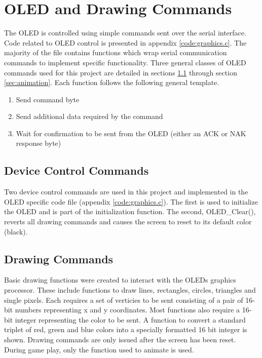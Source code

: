 \section{OLED and Drawing Commands} 
\label{sec:graphics}

%   
The OLED is controlled using simple commands sent over the serial interface. 
Code related to OLED control is presented in appendix \ref{code:graphics.c}.
The majority of the file contains functions which wrap serial communication commands to implement specific functionality.
Three general classes of OLED commands used for this project are detailed in sections \ref{sec:devctrl} through section \ref{sec:animation}.
Each function follows the following general template.

\begin{enumerate}
    \item Send command byte
    \item Send additional data required by the command
    \item Wait for confirmation to be sent from the OLED (either an ACK or NAK response byte)
\end{enumerate}


\subsection{Device Control Commands}
\label{sec:devctrl}

Two device control commands are used in this project and implemented in the OLED specific code file (appendix \ref{code:graphics.c}).
The first is used to initialize the OLED and is part of the initialization function.
The second, OLED\_Clear(), reverts all drawing commands and causes the screen to reset to its default color (black). 

\subsection{Drawing Commands}

Basic drawing functions were created to interact with the OLEDs graphics processor.
These include functions to draw lines, rectangles, circles, triangles and single pixels.
Each requires a set of verticies to be sent consisting of a pair of 16-bit numbers representing x and y coordinates.
Most functions also require a 16-bit integer representing the color to be sent.
A function to convert a standard triplet of red, green and blue colors into a specially formatted 16 bit integer is shown.
Drawing commands are only issued after the screen has been reset.
During game play, only the function used to animate is used. %

